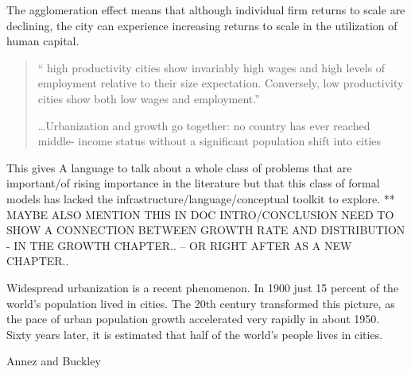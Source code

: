 The \gls{agglomeration effect} means that although individual firm returns to scale are declining, the city can experience \gls{increasing returns to scale} in the utilization of human capital. %






\begin{quotation}`` high productivity cities show invariably high wages and high levels of employment relative to their size expectation. Conversely, low productivity cities show both low wages and employment.''

\dots Urbanization and growth go together: no country has ever reached middle- income status without a significant population shift into cities \cite{annezUrbanizationGrowthSetting2009}\end{quotation}




This gives 
A language to talk about a whole class of problems that are important/of rising importance in the literature but that this class of formal models has lacked the infrastructure/language/conceptual toolkit to explore. ** MAYBE ALSO MENTION THIS IN DOC INTRO/CONCLUSION
NEED TO SHOW A CONNECTION BETWEEN GROWTH RATE AND DISTRIBUTION - IN THE GROWTH CHAPTER.. -- OR RIGHT AFTER AS A NEW CHAPTER..



\epigraph{Widespread urbanization is a recent phenomenon. In 1900 just 15 percent of the world’s population lived in cities. The 20th century transformed this picture, as the pace of urban population growth accelerated very rapidly in about 1950. Sixty years later, it is estimated that half of the world’s people lives in cities.}{Annez and Buckley\cite{annezUrbanizationGrowthSetting2009}}


